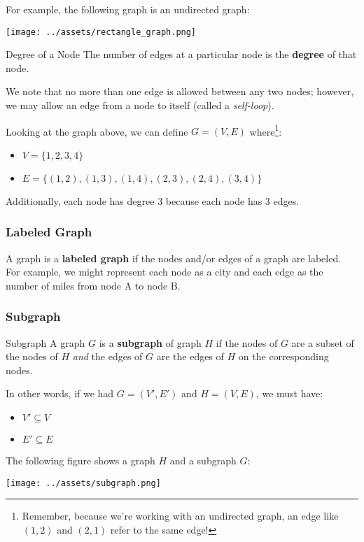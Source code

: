 \documentclass[letterpaper]{article}
\begin{document}
\bigskip

For example, the following graph is an undirected graph:
\begin{center}
    \texttt{[image: ../assets/rectangle\_graph.png]}
\end{center}

\begin{definition}{Degree of a Node}{}
    The number of edges at a particular node is the \textbf{degree} of that node. 
\end{definition}
We note that no more than one edge is allowed between any two nodes; however, we may allow an edge from a node to itself (called a \emph{self-loop}). 

\bigskip

Looking at the graph above, we can define $G = (V, E)$ where\footnote{Remember, because we're working with an undirected graph, an edge like $(1, 2)$ and $(2, 1)$ refer to the same edge!}:
\begin{itemize}
    \item $V = \{1, 2, 3, 4\}$
    \item $E = \{(1, 2), (1, 3), (1, 4), (2, 3), (2, 4), (3, 4)\}$
\end{itemize}
Additionally, each node has degree 3 because each node has 3 edges.  

\subsubsection{Labeled Graph}
A graph is a \textbf{labeled graph} if the nodes and/or edges of a graph are labeled. For example, we might represent each node as a city and each edge as the number of miles from node A to node B. 

\subsubsection{Subgraph}
\begin{definition}{Subgraph}{}
    A graph $G$ is a \textbf{subgraph} of graph $H$ if the nodes of $G$ are a subset of the nodes of $H$ \emph{and} the edges of $G$ are the edges of $H$ on the corresponding nodes.
\end{definition}
In other words, if we had $G = (V', E')$ and $H = (V, E)$, we must have:
\begin{itemize}
    \item $V' \subseteq V$
    \item $E' \subseteq E$
\end{itemize}
The following figure shows a graph $H$ and a subgraph $G$:
\begin{center}
    \texttt{[image: ../assets/subgraph.png]}
\end{center}
\end{document}
